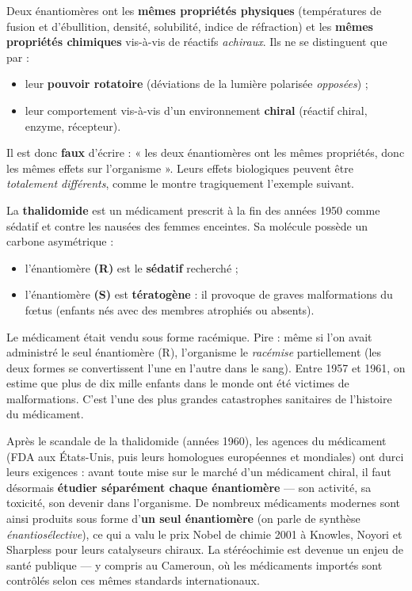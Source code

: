 \documentclass[11pt]{article}
\newcounter{popsec}
\newcounter{popsub}
\newcommand{\courssub}[1]{%
  \stepcounter{popsub}%
  \par\vspace{9pt}\noindent{\popxbold\fontsize{11.5}{13}\selectfont\color{popink}{\color{poporange}\thepopsec.\thepopsub}\hspace{6pt}#1}\par\nopagebreak\vspace{4pt}
}
\begin{document}
\begin{attention}
Deux énantiomères ont les \textbf{mêmes propriétés physiques} (températures de fusion et d'ébullition, densité, solubilité, indice de réfraction) et les \textbf{mêmes propriétés chimiques} vis-à-vis de réactifs \emph{achiraux}. Ils ne se distinguent que par :
\begin{itemize}
\item leur \textbf{pouvoir rotatoire} (déviations de la lumière polarisée \emph{opposées}) ;
\item leur comportement vis-à-vis d'un environnement \textbf{chiral} (réactif chiral, enzyme, récepteur).
\end{itemize}
Il est donc \textbf{faux} d'écrire : « les deux énantiomères ont les mêmes propriétés, donc les mêmes effets sur l'organisme ». Leurs effets biologiques peuvent être \emph{totalement différents}, comme le montre tragiquement l'exemple suivant.
\end{attention}

\courssub{Le drame de la thalidomide : une leçon historique}

La \textbf{thalidomide} est un médicament prescrit à la fin des années 1950 comme sédatif et contre les nausées des femmes enceintes. Sa molécule possède un carbone asymétrique :
\begin{itemize}
\item l'énantiomère \textbf{(R)} est le \textbf{sédatif} recherché ;
\item l'énantiomère \textbf{(S)} est \textbf{tératogène} : il provoque de graves malformations du fœtus (enfants nés avec des membres atrophiés ou absents).
\end{itemize}
Le médicament était vendu sous forme racémique. Pire : même si l'on avait administré le seul énantiomère (R), l'organisme le \emph{racémise} partiellement (les deux formes se convertissent l'une en l'autre dans le sang). Entre 1957 et 1961, on estime que plus de dix mille enfants dans le monde ont été victimes de malformations. C'est l'une des plus grandes catastrophes sanitaires de l'histoire du médicament.

\begin{savaistu}
Après le scandale de la thalidomide (années 1960), les agences du médicament (FDA aux États-Unis, puis leurs homologues européennes et mondiales) ont durci leurs exigences : avant toute mise sur le marché d'un médicament chiral, il faut désormais \textbf{étudier séparément chaque énantiomère} — son activité, sa toxicité, son devenir dans l'organisme. De nombreux médicaments modernes sont ainsi produits sous forme d'\textbf{un seul énantiomère} (on parle de synthèse \emph{énantiosélective}), ce qui a valu le prix Nobel de chimie 2001 à Knowles, Noyori et Sharpless pour leurs catalyseurs chiraux. La stéréochimie est devenue un enjeu de santé publique — y compris au Cameroun, où les médicaments importés sont contrôlés selon ces mêmes standards internationaux.
\end{savaistu}
\end{document}
